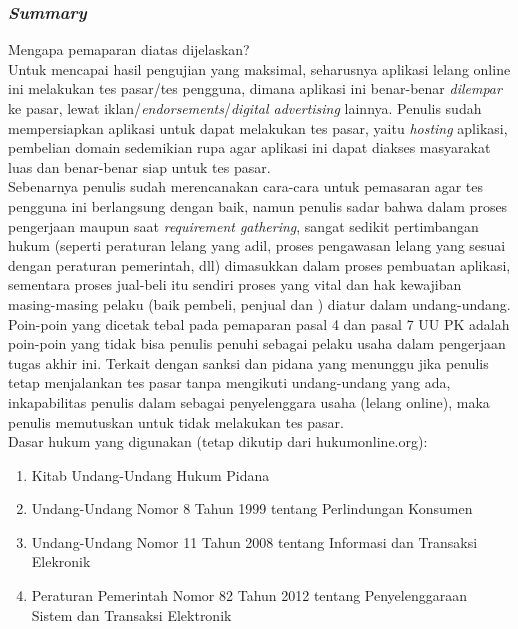 \subsubsection{\textit{Summary}}
	Mengapa pemaparan diatas dijelaskan? \\
	\indent Untuk mencapai hasil pengujian yang maksimal, seharusnya aplikasi lelang online ini melakukan tes pasar/tes pengguna, dimana aplikasi ini benar-benar \textit{dilempar} ke pasar, lewat iklan/\textit{endorsements}/\textit{digital advertising} lainnya. Penulis sudah mempersiapkan aplikasi untuk dapat melakukan tes pasar, yaitu \textit{hosting} aplikasi, pembelian domain sedemikian rupa agar aplikasi ini dapat diakses masyarakat luas dan benar-benar siap untuk tes pasar.\\
	\indent Sebenarnya penulis sudah merencanakan cara-cara untuk pemasaran agar tes pengguna ini berlangsung dengan baik, namun penulis sadar bahwa dalam proses pengerjaan maupun saat \textit{requirement gathering}, sangat sedikit pertimbangan hukum (seperti peraturan lelang yang adil, proses pengawasan lelang yang sesuai dengan peraturan pemerintah, dll) dimasukkan dalam proses pembuatan aplikasi, sementara proses jual-beli itu sendiri proses yang vital dan hak kewajiban masing-masing pelaku (baik pembeli, penjual dan ) diatur dalam undang-undang. \\ 
	\indent Poin-poin yang dicetak tebal pada pemaparan pasal 4 dan pasal 7 UU PK adalah poin-poin yang tidak bisa penulis penuhi sebagai pelaku usaha dalam pengerjaan tugas akhir ini. Terkait dengan sanksi dan pidana yang menunggu jika penulis tetap menjalankan tes pasar tanpa mengikuti undang-undang yang ada, inkapabilitas penulis dalam sebagai penyelenggara usaha (lelang online), maka penulis memutuskan untuk tidak melakukan tes pasar.
	\\

	Dasar hukum yang digunakan (tetap dikutip dari hukumonline.org):
	\begin{enumerate}
		\item Kitab Undang-Undang Hukum Pidana
		\item Undang-Undang Nomor 8 Tahun 1999 tentang Perlindungan Konsumen
		\item Undang-Undang Nomor 11 Tahun 2008 tentang Informasi dan Transaksi Elekronik
		\item Peraturan Pemerintah Nomor 82 Tahun 2012 tentang Penyelenggaraan Sistem dan Transaksi Elektronik
	\end{enumerate}
